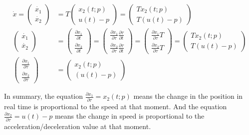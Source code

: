 \documentclass  [
  paper    = a4,
  BCOR     = 10mm,
  twoside,
  fontsize = 12pt,
  fleqn,
  toc      = bibnumbered,
  toc      = listofnumbered,
  numbers  = noendperiod,
  headings = normal,
  listof   = leveldown,
  version  = 3.03
]                                       {scrreprt}
\newcommand{\<}{\langle}
\renewcommand{\>}{\rangle}
\begin{document}
   \begin{subequations}
   	\begin{align}
   	\dot{x} =  \begin{pmatrix} \dot{x_1} \\ \dot{x_2} \end{pmatrix}  & =  T  \begin{pmatrix}  x_2(t;p) \\ u(t)-p   \end{pmatrix} = \begin{pmatrix}  Tx_2(t;p) \\ T(u(t)-p)   \end{pmatrix} \label{eq_difT} \\ 
   	\begin{pmatrix} \dot{x_1} \\ \dot{x_2} \end{pmatrix} &= \begin{pmatrix} \frac{\partial x_1}{\partial t} \\ \frac{\partial x_2}{\partial t} \end{pmatrix} = \begin{pmatrix} \frac{\partial x_1}{\partial \tau} \frac{\partial \tau}{\partial t} \\ \frac{\partial x_2}{\partial \tau} \frac{\partial \tau}{\partial t} \end{pmatrix} =  \begin{pmatrix} \frac{\partial x_1}{\partial \tau} T \\ \frac{\partial x_2}{\partial \tau}T \end{pmatrix} =     \begin{pmatrix}  Tx_2(t;p) \\ T(u(t)-p)   \end{pmatrix} \\
   	\begin{pmatrix} \frac{\partial x_1}{\partial \tau}  \\ \frac{\partial x_2}{\partial \tau} \end{pmatrix} & =     \begin{pmatrix}  x_2(t;p) \\ (u(t)-p)   \end{pmatrix} \label{eq_difTau}
   	\end{align}
   \end{subequations}
   
   In summary, the equation $\frac{\partial x_1}{\partial \tau}= x_2(t;p) $ means the change in the position in real time is proportional to the speed at that moment. And the equation $\frac{\partial x_2}{\partial \tau} = u(t)-p $ means the change in speed is proportional to the acceleration/deceleration value at that moment. 
   
\end{document}
